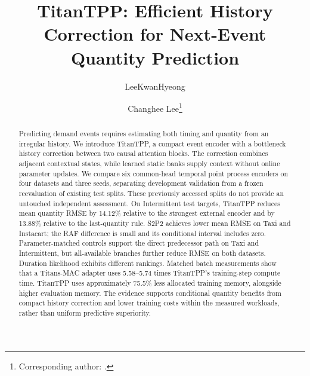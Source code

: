 \documentclass[runningheads]{llncs}
\begin{document}
\title{TitanTPP: Efficient History Correction for Next-Event Quantity Prediction}
\author{LeeKwanHyeong \and Changhee Lee\thanks{Corresponding author: .}}
\maketitle

\begin{abstract}
Predicting demand events requires estimating both timing and quantity from
an irregular history. We introduce TitanTPP, a compact event encoder with
a bottleneck history correction between two causal attention blocks. The
correction combines adjacent contextual states, while learned static banks
supply context without online parameter updates. We compare six common-head
temporal point process encoders on four datasets and three seeds, separating
development validation from a frozen reevaluation of existing test splits.
These previously accessed splits do not provide an untouched independent
assessment. On Intermittent test targets, TitanTPP reduces mean quantity RMSE
by 14.12\% relative to the strongest external encoder and by 13.88\% relative
to the last-quantity rule. S2P2 achieves lower mean RMSE on Taxi and Instacart;
the RAF difference is small and its conditional interval includes zero.
Parameter-matched controls support the direct predecessor path on Taxi and
Intermittent, but all-available branches further reduce RMSE on both datasets.
Duration likelihood exhibits different rankings. Matched batch measurements
show that a Titans-MAC adapter uses 5.58--5.74 times TitanTPP's
training-step compute time. TitanTPP uses approximately 75.5\% less
allocated training memory, alongside higher evaluation memory. The evidence supports conditional
quantity benefits from compact history correction and lower training costs
within the measured workloads, rather than uniform predictive superiority.
\end{abstract}
\end{document}
